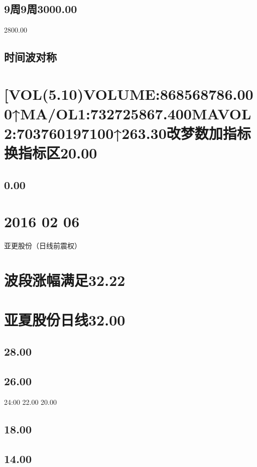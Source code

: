 \documentclass{article}
\begin{document}
\subsection{9周9周3000.00}

2800.00

\subsection{时间波对称}

\section{[VOL(5.10)VOLUME:868568786.000↑MA/OL1:732725867.400MAVOL2:703760197100↑263.30改梦数加指标换指标区20.00}

\subsection{0.00}

\section{2016 02 06}

亚更股份（日线前震权）

\section{波段涨幅满足32.22}

\section{亚夏股份日线32.00}

\subsection{28.00}

\subsection{26.00}

24:00 22.00 20.00

\subsection{18.00}

\subsection{14.00}
\end{document}
